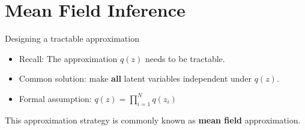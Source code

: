 \documentclass[14pt]{beamer}
\begin{document}
%
%

\section{Mean Field Inference}
\frame{\tableofcontents[currentsection]}

\begin{frame}{Designing a tractable approximation}
\begin{itemize}
\item Recall: The approximation $ q(z) $ needs to be tractable.
\item Common solution: make \textbf{all} latent variables independent under $ q(z) $.
\pause
\item Formal assumption: $ q(z) = \prod_{i=1}^{N}q(z_{i}) $
\end{itemize}
\pause
This approximation strategy is commonly known as \textbf{mean field} approximation.
\end{frame}
\end{document}
